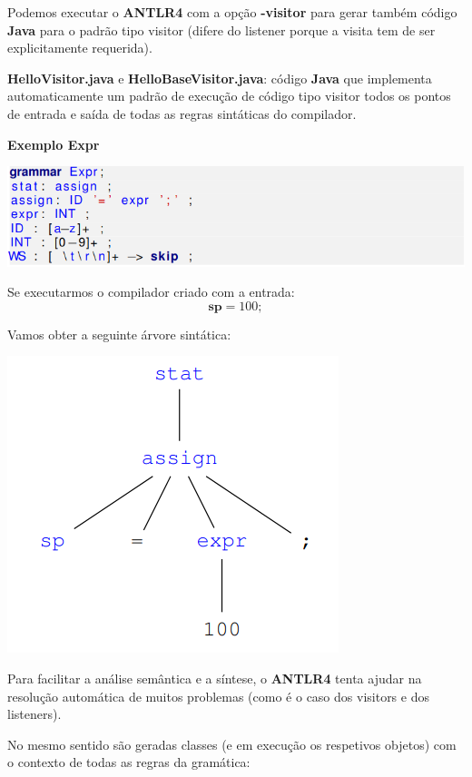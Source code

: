 \documentclass{article}
\begin{document}
\begin{flushleft}
  \item Podemos executar o \textbf{ANTLR4} com a opção \textbf{-visitor}
  para gerar também código \textbf{Java} para o padrão tipo visitor
  (difere do listener porque a visita tem de ser
  explicitamente requerida).
  \item \textbf{HelloVisitor.java} e \textbf{HelloBaseVisitor.java}:
  código \textbf{Java} que implementa automaticamente um padrão
  de execução de código tipo visitor todos os pontos de
  entrada e saída de todas as regras sintáticas do
  compilador.

\end{flushleft}

\begin{flushleft}
  \textbf{Exemplo Expr}

  \begin{center}
    \includegraphics[scale=0.35]{24}
  \end{center}

  \item Se executarmos o compilador criado com a entrada:
  \[\textbf{sp} = 100;\]
  \item Vamos obter a seguinte árvore sintática:
  
  \begin{center}
    \includegraphics[scale=0.4]{25}
  \end{center}

  \item Para facilitar a análise semântica e a síntese, o \textbf{ANTLR4}
  tenta ajudar na resolução automática de muitos
  problemas (como é o caso dos visitors e dos listeners).
  \item No mesmo sentido são geradas classes (e em execução
  os respetivos objetos) com o contexto de todas as
  regras da gramática:


\end{flushleft}
\end{document}
